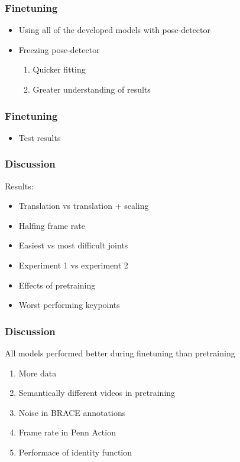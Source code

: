 \documentclass{beamer}
\begin{document}
\begin{frame}
    \frametitle{Finetuning}
    \begin{itemize}
        \item<1-> Using all of the developed models with pose-detector
        \item<1-> Freezing pose-detector
        \begin{enumerate}
            \item Quicker fitting
            \item Greater understanding of results  
        \end{enumerate}
    \end{itemize}
\end{frame}

\begin{frame}
    \frametitle{Finetuning}
    \begin{itemize}
        \item<1-> Test results
    \end{itemize}
\end{frame}

\begin{frame}
    \frametitle{Discussion}
    Results:
    \begin{itemize}
        \item<1-> Translation vs translation + scaling
        \item<2-> Halfing frame rate
        \item<3-> Easiest vs most difficult joints
        \item<4-> Experiment 1 vs experiment 2
        \item<5-> Effects of pretraining
        \item<6-> Worst performing keypoints
    \end{itemize}
\end{frame}

\begin{frame}
    \frametitle{Discussion}
    All models performed better during finetuning than pretraining
    \begin{enumerate}
        \item<1-> More data
        \item<2-> Semantically different videos in pretraining
        \item<3-> Noise in BRACE annotations
        \item<4-> Frame rate in Penn Action
        \item<5-> Performace of identity function
    \end{enumerate}
\end{frame}
\end{document}
